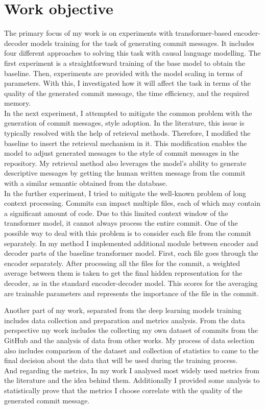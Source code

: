 \section{Work objective}
The primary focus of my work is on experiments with transformer-based encoder-decoder models training for the task of generating commit messages. It includes four different approaches to solving this task with causal language modelling.
The first experiment is a straightforward training of the base model to obtain the baseline. Then, experiments are provided with the model scaling in terms of parameters. With this, I investigated how it will affect the task in terms of the quality of the generated commit message, the time efficiency, and the required memory. \\
In the next experiment, I attempted to mitigate the common problem with the generation of commit messages, style adoption. In the literature, this issue is typically resolved with the help of retrieval methods. Therefore, I modified the baseline to insert the retrieval mechanism in it. This modification enables the model to adjust generated messages to the style of commit messages in the repository. My retrieval method also leverages the model's ability to generate descriptive messages by getting the human written message from the commit with a similar semantic obtained from the database. \\
In the further experiment, I tried to mitigate the well-known problem of long context processing. Сommits can impact multiple files, each of which may contain a significant amount of code. Due to this limited context window of the transformer model, it cannot always process the entire commit. One of the possible way to deal with this problem is to consider each file from the commit separately. In my method I implemented additional module between encoder and decoder parts of the baseline transformer model. First, each file goes through the encoder separately. After processing all the files for the commit, a weighted average between them is taken to get the final hidden representation for the decoder, as in the standard encoder-decoder model. This scores for the averaging are trainable parameters and represents the importance of the file in the commit. 

Another part of my work, separated from the deep learning models training includes data collection and preparation and metrics analysis. From the data perspective my work includes the collecting my own dataset of commits from the GitHub and the analysis of data from other works. My process of data selection also includes comparison of the dataset and collection of statistics to came to the final decision about the data that will be used during the training process. \\
And regarding the metrics, In my work I analysed most widely used metrics from the literature and the idea behind them. Additionally I provided some analysis to statistically prove that the metrics I choose correlate with the quality of the generated commit message.